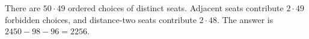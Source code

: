 There are $50\cdot 49$ ordered choices of distinct seats. Adjacent seats contribute $2\cdot 49$ forbidden choices, and distance-two seats contribute $2\cdot 48$. The answer is $2450-98-96=\boxed{2256}$.
